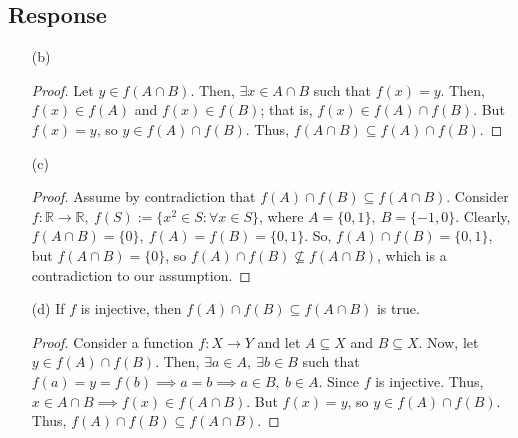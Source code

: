 \documentclass[13pt]{article}
\begin{document}
\subsection*{Response}
\begin{enumerate}
\item [(b)]
  \begin{proof}
    Let $y \in f(A \cap B)$. Then, $\exists x \in A \cap B$ such that $f(x) = y$. Then, $f(x) \in f(A)$ and
    $f(x) \in f(B)$; that is, $f(x) \in f(A) \cap f(B)$. But $f(x) = y$, so $y \in f(A) \cap f(B)$. Thus, $f(A
    \cap B) \subseteq f(A) \cap f(B)$.
  \end{proof}

\item [(c)]
  \begin{proof}
    Assume by contradiction that $f(A) \cap f(B) \subseteq f(A \cap B)$. Consider $f : \mathbb{R} \rightarrow
    \mathbb{R}, \ f(S) := \{x^2 \in S : \forall x \in S\}$, where $A = \{0, 1\}, \ B = \{-1, 0\}$.
    Clearly, $f(A \cap B) = \{0\}, \ f(A) = f(B) = \{0, 1\}$. So, $f(A) \cap f(B) = \{0, 1\}$, but
    $f(A \cap B) = \{0\}$, so $f(A) \cap f(B) \not \subseteq f(A \cap B)$,
    which is a contradiction to our assumption.
  \end{proof}

\item [(d)] If $f$ is injective, then $f(A) \cap f(B) \subseteq f(A \cap B)$ is true.
  \begin{proof}
    Consider a function $f : X \rightarrow Y$ and let $A \subseteq X$ and $B \subseteq X$. Now, let $y \in
    f(A) \cap f(B)$. Then, $\exists a \in A, \ \exists b \in B$ such that $f(a) = y = f(b) \implies a = b
    \implies  a \in B, \ b \in A$. Since $f$ is injective. Thus, $x \in A \cap B \implies f(x) \in f(A \cap B)$.
    But $f(x) = y$, so $y \in f(A) \cap f(B)$. Thus, $f(A) \cap f(B) \subseteq f(A \cap B)$.
  \end{proof}
\end{enumerate}






\newpage
\end{document}

